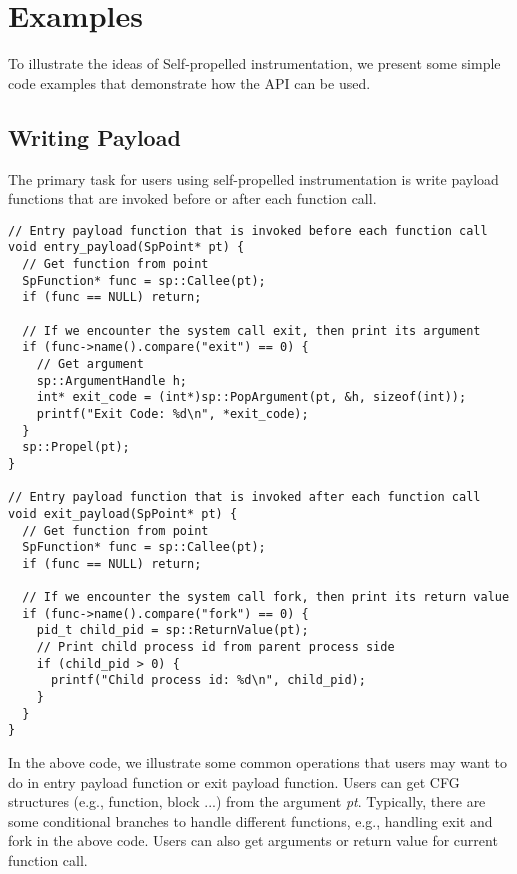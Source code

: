 \section{Examples}
To illustrate the ideas of Self-propelled instrumentation, we present some
simple code examples that demonstrate how the API can be used.

\subsection{Writing Payload}
The primary task for users using self-propelled instrumentation is write
payload
functions that are invoked before or after each function call.
\lstset{numbers=left}
\begin{lstlisting}[caption=Writing payload functions]
// Entry payload function that is invoked before each function call
void entry_payload(SpPoint* pt) {
  // Get function from point
  SpFunction* func = sp::Callee(pt);
  if (func == NULL) return;

  // If we encounter the system call exit, then print its argument
  if (func->name().compare("exit") == 0) {
    // Get argument
    sp::ArgumentHandle h;
    int* exit_code = (int*)sp::PopArgument(pt, &h, sizeof(int));
    printf("Exit Code: %d\n", *exit_code);
  }
  sp::Propel(pt);
}

// Entry payload function that is invoked after each function call
void exit_payload(SpPoint* pt) {
  // Get function from point
  SpFunction* func = sp::Callee(pt);
  if (func == NULL) return;

  // If we encounter the system call fork, then print its return value
  if (func->name().compare("fork") == 0) {
    pid_t child_pid = sp::ReturnValue(pt);
    // Print child process id from parent process side
    if (child_pid > 0) {
      printf("Child process id: %d\n", child_pid);
    }
  }
}
\end{lstlisting}
In the above code, we illustrate some common operations that users may want to
do in entry payload function or exit payload function.
Users can get CFG structures (e.g., function, block ...) from the argument {\em
  pt}.
Typically, there are some conditional branches to handle different functions,
e.g., handling exit and fork in the above code.
Users can also get arguments or return value for current function call.


